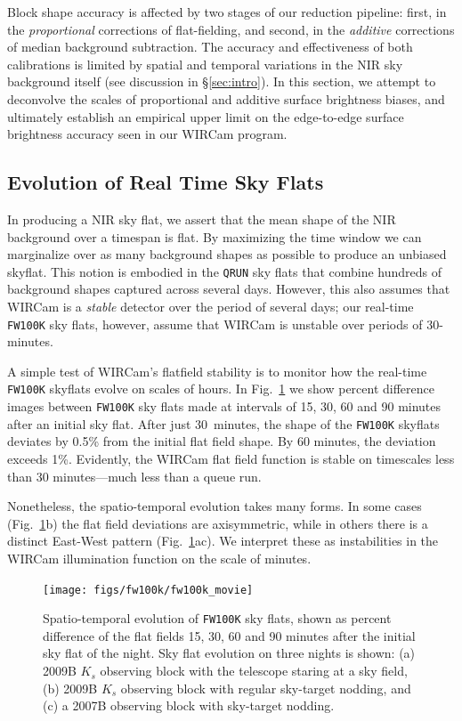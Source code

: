 \documentclass[iop]{emulateapj}
\newcommand{\Fig}[1]{Fig.~\ref{fig:#1}}  %
\newcommand{\Sec}[1]{\S\ref{sec:#1}}  %
\begin{document}
Block shape accuracy is affected by two stages of our reduction pipeline: first, in the \emph{proportional} corrections of flat-fielding, and second, in the \emph{additive} corrections of median background subtraction.
The accuracy and effectiveness of both calibrations is limited by spatial and temporal variations in the NIR sky background itself (see discussion in \Sec{intro}).
In this section, we attempt to deconvolve the scales of proportional and additive surface brightness biases, and ultimately establish an empirical upper limit on the edge-to-edge surface brightness accuracy seen in our WIRCam program.

\subsection{Evolution of Real Time Sky Flats} %
\label{sec:flatevo}

In producing a NIR sky flat, we assert that the mean shape of the NIR background over a timespan is flat.
By maximizing the time window we can marginalize over as many background shapes as possible to produce an unbiased skyflat.
This notion is embodied in the \texttt{QRUN} sky flats that combine hundreds of background shapes captured across several days.
However, this also assumes that WIRCam is a \emph{stable} detector over the period of several days; our real-time \texttt{FW100K} sky flats, however, assume that WIRCam is unstable over periods of 30-minutes.

A simple test of WIRCam's flatfield stability is to monitor how the real-time \texttt{FW100K} skyflats evolve on scales of hours.
In \Fig{fw100k_movie} we show percent difference images between \texttt{FW100K} sky flats made at intervals of 15, 30, 60 and 90 minutes after an initial sky flat.
After just 30~minutes, the shape of the \texttt{FW100K} skyflats deviates by 0.5\% from the initial flat field shape.
By 60 minutes, the deviation exceeds 1\%.
Evidently, the WIRCam flat field function is stable on timescales less than 30 minutes---much less than a queue run.

Nonetheless, the spatio-temporal evolution takes many forms.
In some cases (\Fig{fw100k_movie}b) the flat field deviations are axisymmetric, while in others there is a distinct East-West pattern (\Fig{fw100k_movie}ac).
We interpret these as instabilities in the WIRCam illumination function on the scale of minutes.

\begin{figure}[t]
\centering
\texttt{[image: figs/fw100k/fw100k\_movie]}
\caption{Spatio-temporal evolution of \texttt{FW100K} sky flats, shown as percent difference of the flat fields 15, 30, 60 and 90 minutes after the initial sky flat of the night.
Sky flat evolution on three nights is shown: (a) 2009B $K_s$ observing block with the telescope staring at a sky field, (b) 2009B $K_s$ observing block with regular sky-target nodding, and (c) a 2007B observing block with sky-target nodding.}
\label{fig:fw100k_movie}
\end{figure}
\end{document}
